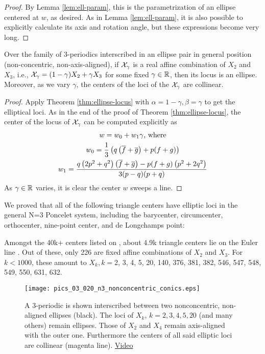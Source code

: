 \begin{proof}
By Lemma \ref{lem:ell-param}, this is the parametrization of an ellipse centered at $w$, as desired. As in Lemma \ref{lem:ell-param}, it is also possible to explicitly calculate its axis and rotation angle, but these expressions become very long.

\end{proof}

\begin{corollary}
Over the family of 3-periodics interscribed in an ellipse pair in general position (non-concentric, non-axis-aligned),
if $\mathcal{X}_\gamma$ is a real affine combination of $X_2$ and $X_3$, i.e., $\mathcal{X}_\gamma=(1-\gamma) X_2+\gamma X_3$ for some fixed $\gamma\in\mathbb{R}$, then its locus is an ellipse. Moreover, as we vary $\gamma$, the centers of the loci of the $\mathcal{X}_\gamma$ are collinear.
\end{corollary}

\begin{proof}
Apply Theorem \ref{thm:ellipse-locus} with $\alpha=1-\gamma, \beta=\gamma$ to get the elliptical loci. As in the end of the proof of Theorem \ref{thm:ellipse-locus}, the center of the locus of $\mathcal{X}_\gamma$ can be computed explicitly as 
\begin{gather*}
    w=w_0+w_1 \gamma \text{, where}\\
    w_0=\frac{1}{3} \left(q \left(\overline{f}+\overline{g}\right)+p (f+g)\right)\\
    w_1=\frac{q \left(2 p^2+q^2\right) \left(\overline{f}+\overline{g}\right)-p (f+g) \left(p^2+2 q^2\right)}{3 (p-q) (p+q)}
\end{gather*}
As $\gamma\in\mathbb{R}$ varies, it is clear the center $w$ sweeps a line.
\end{proof}

We proved that all of the following triangle centers have elliptic loci in the general N=3 Poncelet system, including the barycenter, circumcenter, orthocenter, nine-point center, and de Longchamps point:

\begin{observation}
Amongst the 40k+ centers listed on \cite{etc}, about 4.9k triangle centers lie on the Euler line \cite{etc-central-lines}. Out of these, only 226 are fixed affine combinations of $X_2$ and $X_3$. For $k<1000$, these amount to $X_k,k=${\small 2, 3, 4, 5, 20, 140, 376, 381, 382, 546, 547, 548, 549, 550, 631, 
632}.
\label{obs:affine-euler-line}
\end{observation}

\begin{figure}
     \centering
     \texttt{[image: pics\_03\_020\_n3\_nonconcentric\_conics.eps]}
     \caption{A 3-periodic is shown interscribed between two nonconcentric, non-aligned ellipses (black). The loci of $X_k$, $k=2,3,4,5,20$ (and many others) remain ellipses. Those of $X_2$ and $X_4$ remain axis-aligned with the outer one. Furthermore the centers of all said elliptic loci are collinear (magenta line). \href{https://youtu.be/p1medAei_As}{Video}}
     \label{fig:nonconcentric-xns}
 \end{figure}
 

